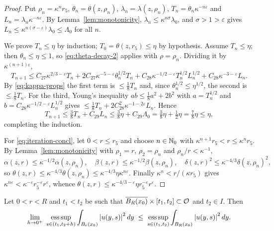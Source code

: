 \documentclass[11pt,reqno]{amsart}
\begin{document}
\begin{proof}
Put $\rho_{n}=\kappa^{n}r_{5}$, $\theta_{n}=\theta(z,\rho_{n})$,
$\lambda_{n}=\lambda(z,\rho_{n})$, $T_{n}=\theta_{n}\kappa^{-n\varepsilon}$ and
$L_{n}=\lambda_{n}\kappa^{-n\varepsilon}$. By Lemma~\ref{lem:monotonicity},
$\lambda_{n}\le\kappa^{n\sigma}\lambda_{0}$, and $\sigma>1>\varepsilon$ gives
$L_{n}\le\kappa^{n(\sigma-\varepsilon)}\lambda_{0}\le\Lambda_{0}$ for all $n$.

We prove $T_{n}\le\eta$ by induction; $T_{0}=\theta(z,r_{5})\le\eta$ by
hypothesis. Assume $T_{n}\le\eta$; then $\theta_{n}\le\eta\le1$, so
\eqref{eq:theta-decay-2} applies with $\rho=\rho_{n}$. Dividing it by
$\kappa^{(n+1)\varepsilon}$,
\[
  T_{n+1}\le C_{27}\kappa^{2/3-\varepsilon}T_{n}
   +2C_{27}\kappa^{-5-\varepsilon}\theta_{n}^{1/2}T_{n}
   +C_{28}\kappa^{-1/2-\varepsilon}T_{n}^{1/2}L_{n}^{1/2}
   +C_{28}\kappa^{-3-\varepsilon}L_{n}.
\]
By \eqref{eq:kappa-props} the first term is $\le\tfrac18T_{n}$ and, since
$\theta_{n}^{1/2}\le\eta^{1/2}$, the second is $\le\tfrac18T_{n}$. For the third,
Young's inequality $ab\le\tfrac18a^{2}+2b^{2}$ with $a=T_{n}^{1/2}$ and
$b=C_{28}\kappa^{-1/2-\varepsilon}L_{n}^{1/2}$ gives
$\le\tfrac18T_{n}+2C_{28}^{2}\kappa^{-1-2\varepsilon}L_{n}$. Hence
\[
  T_{n+1}\le\tfrac38T_{n}+C_{29}L_{n}
   \le\tfrac38\eta+C_{29}\Lambda_{0}=\tfrac38\eta+\tfrac12\eta=\tfrac78\eta\le\eta,
\]
completing the induction.

For \eqref{eq:iteration-concl}, let $0<r\le r_{5}$ and choose $n\in\mathbb{N}_{0}$ with
$\kappa^{n+1}r_{5}<r\le\kappa^{n}r_{5}$. By Lemma~\ref{lem:monotonicity} with
$\rho_{1}=r$, $\rho_{2}=\rho_{n}$ and $\rho_{n}/r<\kappa^{-1}$,
\[
  \alpha(z,r)\le\kappa^{-1/2}\alpha(z,\rho_{n}),\quad
  \beta(z,r)\le\kappa^{-1/2}\beta(z,\rho_{n}),\quad
  \delta(z,r)^{2}\le\kappa^{-4/3}\delta(z,\rho_{n})^{2},
\]
so $\theta(z,r)\le\kappa^{-4/3}\theta(z,\rho_{n})\le\kappa^{-4/3}\eta\kappa^{n\varepsilon}$.
Finally $\kappa^{n}<r/(\kappa r_{5})$ gives
$\kappa^{n\varepsilon}<\kappa^{-\varepsilon}r_{5}^{-\varepsilon}r^{\varepsilon}$,
whence $\theta(z,r)\le\kappa^{-4/3-\varepsilon}\eta r_{5}^{-\varepsilon}r^{\varepsilon}$.
\end{proof}

\begin{lemma}
\label{lem:alpha-usc}
Let $0<r<R$ and $t_{1}<t_{2}$ be such that
$\overline{B_{R}(x_{0})}\times[t_{1},t_{2}]\subset\mathcal{O}$ and
$t_{2}\in I$. Then
\begin{equation}\label{eq:alpha-usc}
  \lim_{h\to0^{+}}\ \operatorname*{ess\,sup}_{s\in(t_{1},t_{2}+h)}
     \int_{B_{r}(x_{0})}\left\lvert u(y,s) \right\rvert^{2}dy
  \;\le\;\operatorname*{ess\,sup}_{s\in(t_{1},t_{2})}
     \int_{B_{R}(x_{0})}\left\lvert u(y,s) \right\rvert^{2}dy .
\end{equation}
\end{lemma}
\end{document}
